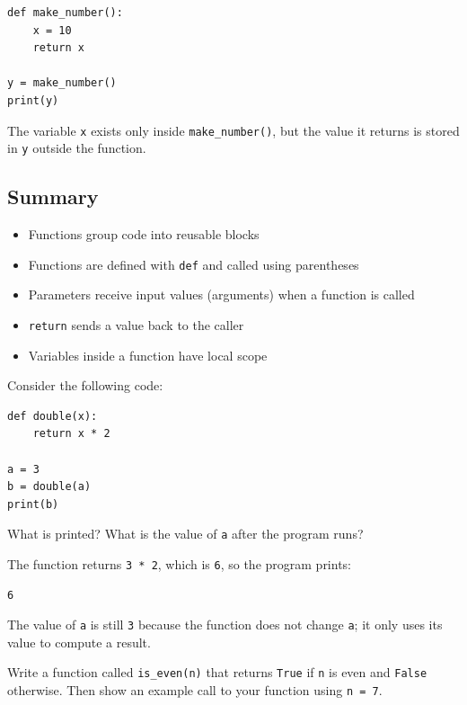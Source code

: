 \begin{verbatim}
def make_number():
    x = 10
    return x

y = make_number()
print(y)
\end{verbatim}

The variable \texttt{x} exists only inside \texttt{make_number()}, but the value it returns
is stored in \texttt{y} outside the function.

\subsection{Summary}
\begin{itemize}
    \item Functions group code into reusable blocks
    \item Functions are defined with \texttt{def} and called using parentheses
    \item Parameters receive input values (arguments) when a function is called
    \item \texttt{return} sends a value back to the caller
    \item Variables inside a function have local scope
\end{itemize}

\begin{Exercise}[label=functions1, title=Tracing a Function Call]
Consider the following code:
\begin{verbatim}
def double(x):
    return x * 2

a = 3
b = double(a)
print(b)
\end{verbatim}
What is printed? What is the value of \texttt{a} after the program runs?
\end{Exercise}

\begin{Answer}[ref=functions1]
The function returns \texttt{3 * 2}, which is \texttt{6}, so the program prints:
\begin{verbatim}
6
\end{verbatim}
The value of \texttt{a} is still \texttt{3} because the function does not change \texttt{a}; it only uses its value to compute a result.
\end{Answer}

\begin{Exercise}[label=functions2, title=Write a Function]
Write a function called \texttt{is_even(n)} that returns \texttt{True} if \texttt{n} is even and \texttt{False} otherwise.
Then show an example call to your function using \texttt{n = 7}.
\end{Exercise}

